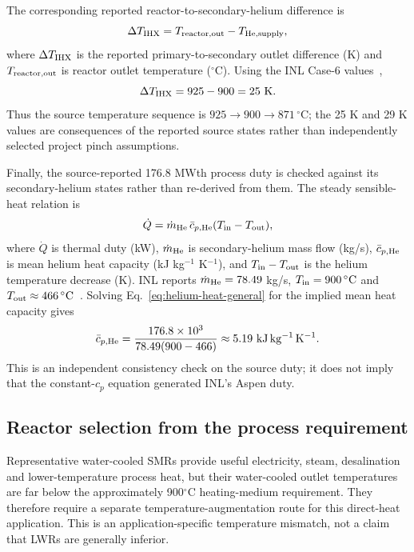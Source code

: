 The corresponding reported reactor-to-secondary-helium difference is
\begin{equation}\label{eq:ihx-dt-general}
\Delta T_{\rm IHX}
=T_{\rm reactor,out}-T_{\rm He,supply},
\end{equation}
where $\Delta T_{\rm IHX}$ is the reported primary-to-secondary outlet difference (K) and $T_{\rm reactor,out}$ is reactor outlet temperature ($^{\circ}$C). Using the INL Case-6 values~\cite{inltev961},
\begin{equation}\label{eq:temperature-cascade}
\Delta T_{\rm IHX}=925-900=25~\mathrm K.
\end{equation}
Thus the source temperature sequence is $925\rightarrow900\rightarrow871\,^{\circ}\mathrm C$; the 25 K and 29 K values are consequences of the reported source states rather than independently selected project pinch assumptions.

Finally, the source-reported 176.8 MWth process duty is checked against its secondary-helium states rather than re-derived from them. The steady sensible-heat relation is
\begin{equation}\label{eq:helium-heat-general}
\dot Q=\dot m_{\rm He}\,\bar c_{p,\rm He}
(T_{\rm in}-T_{\rm out}),
\end{equation}
where $\dot Q$ is thermal duty (kW), $\dot m_{\rm He}$ is secondary-helium mass flow (kg/s), $\bar c_{p,\rm He}$ is mean helium heat capacity (kJ kg$^{-1}$ K$^{-1}$), and $T_{\rm in}-T_{\rm out}$ is the helium temperature decrease (K). INL reports $\dot m_{\rm He}=78.49$ kg/s, $T_{\rm in}=900\,^{\circ}\mathrm C$ and $T_{\rm out}\approx466\,^{\circ}\mathrm C$~\cite{inltev961}. Solving Eq.~\ref{eq:helium-heat-general} for the implied mean heat capacity gives
\begin{equation}\label{eq:helium-cp-check}
\bar c_{p,\rm He}
=\frac{176.8\times10^3}
{78.49(900-466)}
\approx5.19~\mathrm{kJ\,kg^{-1}\,K^{-1}}.
\end{equation}
This is an independent consistency check on the source duty; it does not imply that the constant-$c_p$ equation generated INL's Aspen duty.

\subsection{Reactor selection from the process requirement}
Representative water-cooled SMRs provide useful electricity, steam, desalination and lower-temperature process heat, but their water-cooled outlet temperatures are far below the approximately 900$^\circ$C heating-medium requirement.  They therefore require a separate temperature-augmentation route for this direct-heat application.  This is an application-specific temperature mismatch, not a claim that LWRs are generally inferior.

